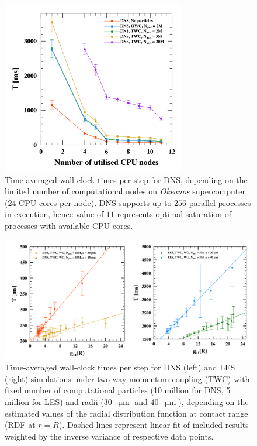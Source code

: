 
\begin{figure}
\centering
\includegraphics[width=8cm]{figures/3-04_pfspfn.pdf}
\caption{
Time-averaged wall-clock times per step for DNS, depending on the limited number of computational nodes on \emph{Okeanos} supercomputer (24 CPU cores per node).
DNS supports up to $256$ parallel processes in execution, hence value of $11$ represents optimal saturation of processes with available CPU cores.
}
\label{fig:pfspfn}
\end{figure}


\begin{figure}
\centering
\includegraphics[width=13.5cm]{figures/3-05_pfsrdf.pdf}
\caption{
Time-averaged wall-clock times per step for DNS (left) and LES (right) simulations under two-way momentum coupling (TWC) with fixed number of computational particles (10 million for DNS, 5 million for LES) and radii ($30$~$\upmu\text{m}$ and $40$~$\upmu\text{m}$), depending on the estimated values of the radial distribution function at contact range (RDF at $r=R$).
Dashed lines represent linear fit of included results weighted by the inverse variance of respective data points.
}
\label{fig:pfsrdf}
\end{figure}

